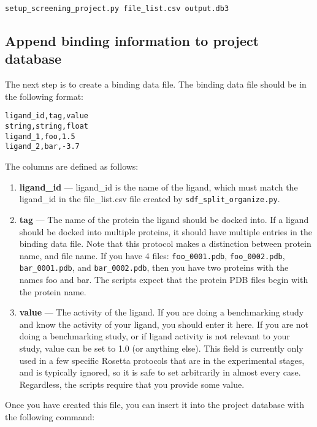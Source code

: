 \begin{verbatim}
setup_screening_project.py file_list.csv output.db3 
\end{verbatim}

\subsection{Append binding information to project database}

The next step is to create a binding data file. The binding data file should be in the following format:

\begin{verbatim}
ligand_id,tag,value
string,string,float
ligand_1,foo,1.5
ligand_2,bar,-3.7
\end{verbatim}

The columns are defined as follows:

\begin{enumerate}
\def\labelenumi{\arabic{enumi}.}
\item \textbf{ligand\_id} --- ligand\_id is the name of the ligand, which must match the ligand\_id in the file\_list.csv file created by \texttt{sdf\_split\_organize.py}.
\item \textbf{tag} --- The name of the protein the ligand should be docked into. If a ligand should be docked into multiple proteins, it should have multiple entries in the binding data file.
  Note that this protocol makes a distinction between protein name, and file name.
  If you have 4 files: \texttt{foo\_0001.pdb}, \texttt{foo\_0002.pdb}, \texttt{bar\_0001.pdb}, and \texttt{bar\_0002.pdb}, then you have two proteins with the names foo and bar.
  The scripts expect that the protein PDB files begin with the protein name.
\item \textbf{value} --- The activity of the ligand. If you are doing a benchmarking study and know the activity of your ligand, you should enter it here.
  If you are not doing a benchmarking study, or if ligand activity is not relevant to your study, value can be set to 1.0 (or anything else). 
  This field is currently only used in a few specific Rosetta protocols that are in the experimental stages, and is typically ignored, so it is safe to set arbitrarily in almost every case.
  Regardless, the scripts require that you provide some value.
\end{enumerate}

Once you have created this file, you can insert it into the project
database with the following command:

